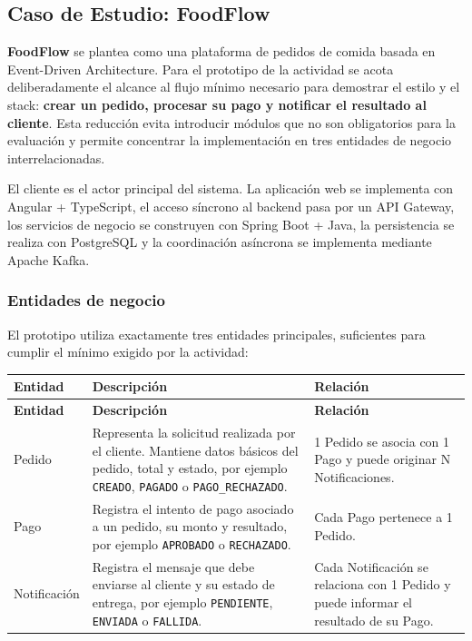 \documentclass[12pt,a4paper]{article}
\begin{document}
\subsection{Caso de Estudio: FoodFlow}

\textbf{FoodFlow} se plantea como una plataforma de pedidos de comida basada en Event-Driven Architecture. Para el prototipo de la actividad se acota deliberadamente el alcance al flujo mínimo necesario para demostrar el estilo y el stack: \textbf{crear un pedido, procesar su pago y notificar el resultado al cliente}. Esta reducción evita introducir módulos que no son obligatorios para la evaluación y permite concentrar la implementación en tres entidades de negocio interrelacionadas.

El cliente es el actor principal del sistema. La aplicación web se implementa con Angular + TypeScript, el acceso síncrono al backend pasa por un API Gateway, los servicios de negocio se construyen con Spring Boot + Java, la persistencia se realiza con PostgreSQL y la coordinación asíncrona se implementa mediante Apache Kafka.

\subsubsection{Entidades de negocio}

El prototipo utiliza exactamente tres entidades principales, suficientes para cumplir el mínimo exigido por la actividad:

\begin{longtable}{P{0.18\textwidth} P{0.43\textwidth} P{0.27\textwidth}}
\toprule
\textbf{Entidad} & \textbf{Descripción} & \textbf{Relación} \\
\midrule
\endfirsthead
\toprule
\textbf{Entidad} & \textbf{Descripción} & \textbf{Relación} \\
\midrule
\endhead
Pedido & Representa la solicitud realizada por el cliente. Mantiene datos básicos del pedido, total y estado, por ejemplo \texttt{CREADO}, \texttt{PAGADO} o \texttt{PAGO\_RECHAZADO}. & 1 Pedido se asocia con 1 Pago y puede originar N Notificaciones. \\
Pago & Registra el intento de pago asociado a un pedido, su monto y resultado, por ejemplo \texttt{APROBADO} o \texttt{RECHAZADO}. & Cada Pago pertenece a 1 Pedido. \\
Notificación & Registra el mensaje que debe enviarse al cliente y su estado de entrega, por ejemplo \texttt{PENDIENTE}, \texttt{ENVIADA} o \texttt{FALLIDA}. & Cada Notificación se relaciona con 1 Pedido y puede informar el resultado de su Pago. \\
\bottomrule
\end{longtable}
\end{document}
